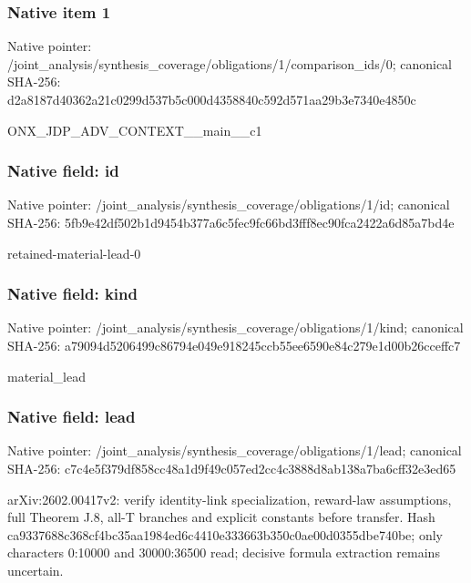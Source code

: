 \documentclass[10pt,a4paper]{article}
\begin{document}
\subsubsection{Native item 1}
Native pointer: /joint\_\allowbreak{}analysis/synthesis\_\allowbreak{}coverage/obligations/1/comparison\_\allowbreak{}ids/0; canonical SHA-256: d2a8187d40362a21c0299d537b5c000d4358840c592d571aa29b3e7340e4850c

\begingroup\raggedright\sloppy ONX\_\allowbreak{}JDP\_\allowbreak{}ADV\_\allowbreak{}CONTEXT\_\allowbreak{}\_\allowbreak{}main\_\allowbreak{}\_\allowbreak{}c1\par\endgroup

\subsubsection{Native field: id}
Native pointer: /joint\_\allowbreak{}analysis/synthesis\_\allowbreak{}coverage/obligations/1/id; canonical SHA-256: 5fb9e42df502b1d9454b377a6c5fec9fc66bd3fff8ec90fca2422a6d85a7bd4e

\begingroup\raggedright\sloppy retained-material-lead-0\par\endgroup

\subsubsection{Native field: kind}
Native pointer: /joint\_\allowbreak{}analysis/synthesis\_\allowbreak{}coverage/obligations/1/kind; canonical SHA-256: a79094d5206499c86794e049e918245ccb55ee6590e84c279e1d00b26cceffc7

\begingroup\raggedright\sloppy material\_\allowbreak{}lead\par\endgroup

\subsubsection{Native field: lead}
Native pointer: /joint\_\allowbreak{}analysis/synthesis\_\allowbreak{}coverage/obligations/1/lead; canonical SHA-256: c7c4e5f379df858cc48a1d9f49c057ed2cc4c3888d8ab138a7ba6cff32e3ed65

\begingroup\raggedright\sloppy arXiv:\allowbreak{}2602.00417v2:\allowbreak{} verify identity-link specialization,\allowbreak{} reward-law assumptions,\allowbreak{} full Theorem J.8,\allowbreak{} all-T branches and explicit constants before transfer. Hash ca9337688c368cf4bc35aa1984ed6c4410e333663b350c0ae00d0355dbe740be;\allowbreak{} only characters 0:\allowbreak{}10000 and 30000:\allowbreak{}36500 read;\allowbreak{} decisive formula extraction remains uncertain.\par\endgroup
\end{document}
